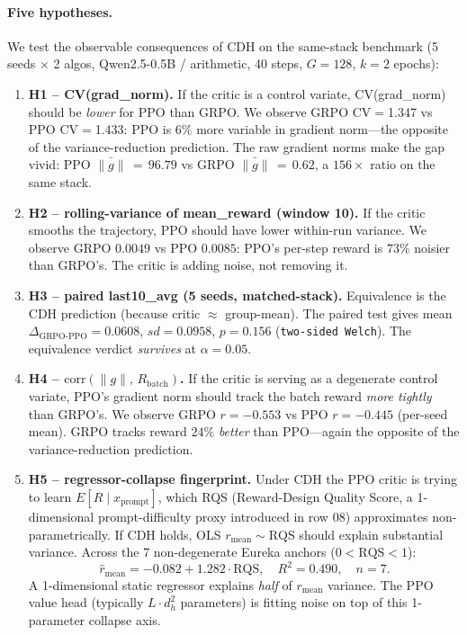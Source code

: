\paragraph{Five hypotheses.}
We test the observable consequences of CDH on the same-stack
benchmark (5 seeds $\times$ 2 algos, Qwen2.5-0.5B / arithmetic, 40
steps, $G{=}128$, $k{=}2$ epochs):
\begin{enumerate}\itemsep2pt
\item \textbf{H1 -- CV(grad\_norm).} If the critic is a control
  variate, CV(grad\_norm) should be \emph{lower} for PPO than GRPO.
  We observe GRPO CV$=$1.347 vs PPO CV$=$1.433: PPO is $6\%$ more
  variable in gradient norm---the opposite of the variance-reduction
  prediction. The raw gradient norms make the gap vivid: PPO
  $\bar{\|g\|}\,{=}\,96.79$ vs GRPO $\bar{\|g\|}\,{=}\,0.62$, a
  $156\times$ ratio on the same stack.
\item \textbf{H2 -- rolling-variance of mean\_reward (window 10).}
  If the critic smooths the trajectory, PPO should have lower
  within-run variance. We observe GRPO $0.0049$ vs PPO $0.0085$:
  PPO's per-step reward is $73\%$ noisier than GRPO's. The critic is
  adding noise, not removing it.
\item \textbf{H3 -- paired last10\_avg (5 seeds, matched-stack).}
  Equivalence is the CDH prediction (because critic $\approx$ group-mean).
  The paired test gives mean $\Delta_{\text{GRPO-PPO}}=0.0608$,
  $sd{=}0.0958$, $p{=}0.156$ (\texttt{two-sided Welch}). The
  equivalence verdict \emph{survives} at $\alpha{=}0.05$.
\item \textbf{H4 -- $\mathrm{corr}(\|g\|,\,R_\text{batch})$.} If the
  critic is serving as a degenerate control variate, PPO's gradient
  norm should track the batch reward \emph{more tightly} than GRPO's.
  We observe GRPO $r{=}{-}0.553$ vs PPO $r{=}{-}0.445$ (per-seed mean).
  GRPO tracks reward $24\%$ \emph{better} than PPO---again the
  opposite of the variance-reduction prediction.
\item \textbf{H5 -- regressor-collapse fingerprint.} Under CDH the
  PPO critic is trying to learn $E[R \mid x_\text{prompt}]$, which
  RQS (Reward-Design Quality Score, a 1-dimensional prompt-difficulty
  proxy introduced in row 08) approximates non-parametrically. If
  CDH holds, OLS $r_\text{mean} \sim \mathrm{RQS}$ should explain
  substantial variance. Across the 7 non-degenerate Eureka anchors
  ($0 < \mathrm{RQS} < 1$):
  \begin{equation*}
    \hat r_\text{mean} = -0.082 + 1.282 \cdot \mathrm{RQS},\quad
    R^2 = 0.490,\quad n = 7.
  \end{equation*}
  A 1-dimensional static regressor explains \emph{half} of
  $r_\text{mean}$ variance. The PPO value head (typically
  $L \cdot d_h^2$ parameters) is fitting noise on top of this
  1-parameter collapse axis.
\end{enumerate}

